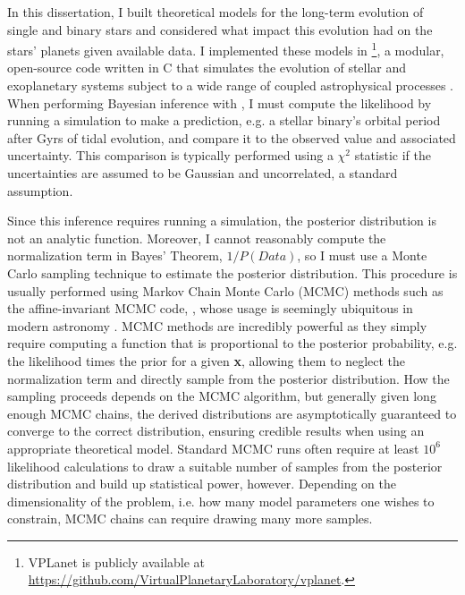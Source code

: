 In this dissertation, I built theoretical models for the long-term evolution of single and binary stars and considered what impact this evolution had on the stars' planets given available data. I implemented these models in \vplanet\footnote{VPLanet is publicly available
at \href{https://github.com/VirtualPlanetaryLaboratory/vplanet}{{https://github.com/VirtualPlanetaryLaboratory/vplanet}}.}, a modular, open-source code written in C that simulates the evolution of stellar and exoplanetary systems subject to a wide range of coupled astrophysical processes \citep{Barnes2019}. When performing Bayesian inference with \vplanet, I must compute the likelihood by running a simulation to make a prediction, e.g. a stellar binary's orbital period after Gyrs of tidal evolution, and compare it to the observed value and associated uncertainty. This comparison is typically performed using a $\chi^2$ statistic if the uncertainties are assumed to be Gaussian and uncorrelated, a standard assumption. 

Since this inference requires running a \vplanet simulation, the posterior distribution is not an analytic function. Moreover, I cannot reasonably compute the normalization term in Bayes' Theorem, $1/P(Data)$, so I must use a Monte Carlo sampling technique to estimate the posterior distribution. This procedure is usually performed using Markov Chain Monte Carlo (MCMC) methods such as the affine-invariant MCMC code, \emcee, whose usage is seemingly ubiquitous in modern astronomy \citep{ForemanMackey2013}. MCMC methods are incredibly powerful as they simply require computing a function that is proportional to the posterior probability, e.g. the likelihood times the prior for a given \textbf{x}, allowing them to neglect the normalization term and directly sample from the posterior distribution. How the sampling proceeds depends on the MCMC algorithm, but generally given long enough MCMC chains, the derived distributions are asymptotically guaranteed to converge to the correct distribution, ensuring credible results when using an appropriate theoretical model. Standard MCMC runs often require at least $10^6$ likelihood calculations to draw a suitable number of samples from the posterior distribution and build up statistical power, however. Depending on the dimensionality of the problem, i.e. how many model parameters one wishes to constrain, MCMC chains can require drawing many more samples.


